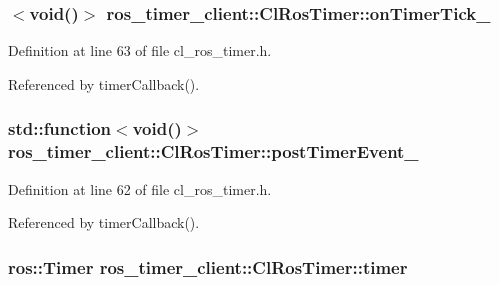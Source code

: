 \subsubsection[{\texorpdfstring{on\+Timer\+Tick\+\_\+}{onTimerTick_}}]{$<$void()$>$ ros\+\_\+timer\+\_\+client\+::\+Cl\+Ros\+Timer\+::on\+Timer\+Tick\+\_\+\hspace{0.3cm}{\ttfamily [protected]}}\hypertarget{classros__timer__client_1_1ClRosTimer_a8c7a2ee6e8e8512b3f997e5560c0dc18}{}\label{classros__timer__client_1_1ClRosTimer_a8c7a2ee6e8e8512b3f997e5560c0dc18}


Definition at line 63 of file cl\+\_\+ros\+\_\+timer.\+h.



Referenced by timer\+Callback().

\subsubsection[{\texorpdfstring{post\+Timer\+Event\+\_\+}{postTimerEvent_}}]{\setlength{\rightskip}{0pt plus 5cm}std\+::function$<$void()$>$ ros\+\_\+timer\+\_\+client\+::\+Cl\+Ros\+Timer\+::post\+Timer\+Event\+\_\+\hspace{0.3cm}{\ttfamily [protected]}}\hypertarget{classros__timer__client_1_1ClRosTimer_a36d871ca009545bf5f43b8b18064e075}{}\label{classros__timer__client_1_1ClRosTimer_a36d871ca009545bf5f43b8b18064e075}


Definition at line 62 of file cl\+\_\+ros\+\_\+timer.\+h.



Referenced by timer\+Callback().

\subsubsection[{\texorpdfstring{timer}{timer}}]{\setlength{\rightskip}{0pt plus 5cm}ros\+::\+Timer ros\+\_\+timer\+\_\+client\+::\+Cl\+Ros\+Timer\+::timer\hspace{0.3cm}{\ttfamily [protected]}}\hypertarget{classros__timer__client_1_1ClRosTimer_a2feedfef1d9db630007af2ca58a7f284}{}\label{classros__timer__client_1_1ClRosTimer_a2feedfef1d9db630007af2ca58a7f284}


